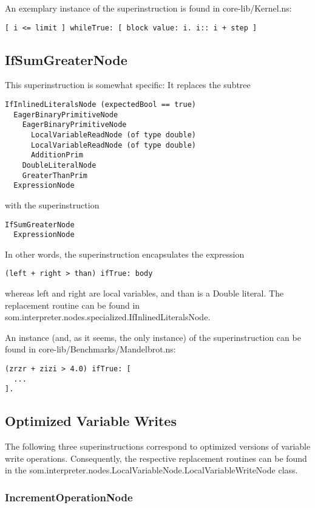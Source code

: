 \documentclass[10pt,a4paper]{article}
\begin{document}
An exemplary instance of the superinstruction is found in \textsf{core-lib/Kernel.ns}:
\begin{verbatim}
[ i <= limit ] whileTrue: [ block value: i. i:: i + step ]
\end{verbatim}

\subsection{IfSumGreaterNode}

This superinstruction is somewhat specific: It replaces the subtree
\begin{verbatim}
IfInlinedLiteralsNode (expectedBool == true)
  EagerBinaryPrimitiveNode
    EagerBinaryPrimitiveNode
      LocalVariableReadNode (of type double)
      LocalVariableReadNode (of type double)
      AdditionPrim
    DoubleLiteralNode
    GreaterThanPrim
  ExpressionNode
\end{verbatim}
with the superinstruction
\begin{verbatim}
IfSumGreaterNode
  ExpressionNode
\end{verbatim}
In other words, the superinstruction encapsulates the expression
\begin{verbatim}
(left + right > than) ifTrue: body
\end{verbatim}
whereas \textsf{left} and \textsf{right} are local variables, and \textsf{than} is a Double literal. The replacement routine can be found in \textsf{som.interpreter.nodes.specialized{\allowbreak}.IfInlinedLiteralsNode}.

An instance (and, as it seems, the only instance) of the superinstruction can be found in \textsf{core-lib/Benchmarks/Mandelbrot.ns}:
\begin{verbatim}
(zrzr + zizi > 4.0) ifTrue: [
  ...
].
\end{verbatim}


\subsection{Optimized Variable Writes}

The following three superinstructions correspond to optimized versions of variable write operations. Consequently, the respective replacement routines can be found in the \textsf{som.interpreter.{\allowbreak}nodes.LocalVariableNode.{\allowbreak}LocalVariableWriteNode} class.

\subsubsection{IncrementOperationNode}
\end{document}
